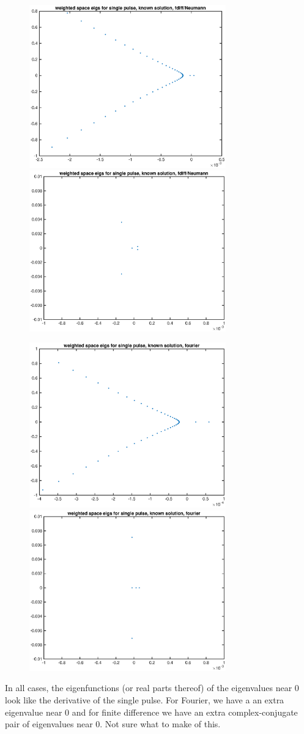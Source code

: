 \documentclass[12pt]{article}
\begin{document}
\begin{figure}[H]
\includegraphics[width=8.5cm]{knownsingleeigs.eps}
\includegraphics[width=8.5cm]{knownsingleeigszoom.eps}
\end{figure}

\begin{figure}[H]
\includegraphics[width=8.5cm]{knownsingleeigsfourier.eps}
\includegraphics[width=8.5cm]{knownsingleeigszoomfourier.eps}
\end{figure}

In all cases, the eigenfunctions (or real parts thereof) of the eigenvalues near 0 look like the derivative of the single pulse. For Fourier, we have a an extra eigenvalue near 0 and for finite difference we have an extra complex-conjugate pair of eigenvalues near 0. Not sure what to make of this.
\end{document}
